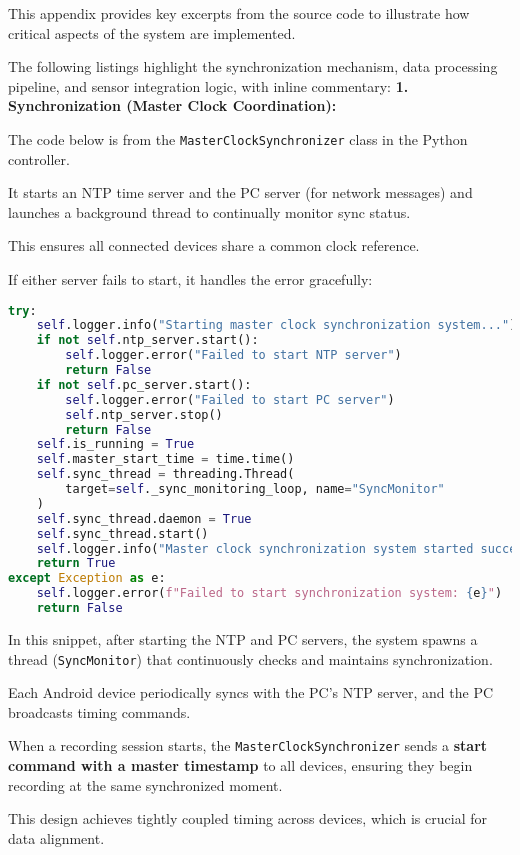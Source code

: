 {{{This appendix provides key excerpts from the source code to illustrate how critical
aspects of the system are implemented.

The following listings highlight the synchronization mechanism, data processing
pipeline, and sensor integration logic, with inline commentary: \textbf{1. Synchronization (Master Clock Coordination):}

The code below is from the \texttt{MasterClockSynchronizer} class in the Python
controller.

It starts an NTP time server and the PC server (for network messages) and launches a
background thread to continually monitor sync status.

This ensures all connected devices share a common clock reference.

If either server fails to start, it handles the error gracefully:

\begin{lstlisting}[language=Python]
try:
    self.logger.info("Starting master clock synchronization system...")
    if not self.ntp_server.start():
        self.logger.error("Failed to start NTP server")
        return False
    if not self.pc_server.start():
        self.logger.error("Failed to start PC server")
        self.ntp_server.stop()
        return False
    self.is_running = True
    self.master_start_time = time.time()
    self.sync_thread = threading.Thread(
        target=self._sync_monitoring_loop, name="SyncMonitor"
    )
    self.sync_thread.daemon = True
    self.sync_thread.start()
    self.logger.info("Master clock synchronization system started successfully")
    return True
except Exception as e:
    self.logger.error(f"Failed to start synchronization system: {e}")
    return False
\end{lstlisting}

In this snippet, after starting the NTP and PC servers, the system spawns a thread 
(\texttt{SyncMonitor}) that continuously checks and maintains synchronization.

Each Android device periodically syncs with the PC's NTP server, and the PC
broadcasts timing commands.

When a recording session starts, the \texttt{MasterClockSynchronizer} sends a
\textbf{start command with a master timestamp} to all devices, ensuring they begin 
recording at the same synchronized moment.

This design achieves tightly coupled timing across devices, which is crucial for data
alignment.

}}}
